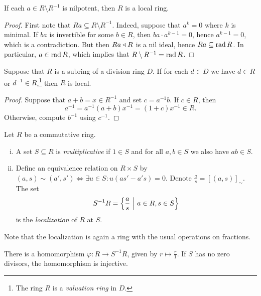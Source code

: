 \begin{trditev}
If each $a \in R \setminus R^{-1}$ is nilpotent, then $R$ is a
local ring.
\end{trditev}

\begin{proof}
First note that $Ra \subseteq R \setminus R^{-1}$. Indeed, suppose
that $a^k = 0$ where $k$ is minimal. If $ba$ is invertible for some
$b \in R$, then $ba \cdot a^{k-1} = 0$, hence $a^{k-1} = 0$, which
is a contradiction. But then $Ra \triangleleft R$ is a nil ideal, hence
$Ra \subseteq \operatorname{rad} R$. In particular, $a \in \operatorname{rad} R$, which implies
that $R \setminus R^{-1} = \operatorname{rad} R$.
\end{proof}

\begin{trditev}
Suppose that $R$ is a subring of a division ring $D$. If for each
$d \in D$ we have $d \in R$ or $d^{-1} \in R$,\footnote{The ring
$R$ is a \emph{valuation ring} in $D$.} then
$R$ is local.
\end{trditev}

\begin{proof}
Suppose that $a+b = x \in R^{-1}$ and set $c = a^{-1} b$. If
$c \in R$, then
\[
a^{-1} = a^{-1} (a+b) x^{-1} = (1 + c) x^{-1} \in R.
\]
Otherwise, compute $b^{-1}$ using $c^{-1}$.
\end{proof}


\begin{definicija}
Let $R$ be a commutative ring.

\begin{enumerate}[i)]
\item A set $S \subseteq R$ is
\emph{multiplicative} if $1 \in S$ and
for all $a, b \in S$ we also have $ab \in S$.
\item Define an equivalence relation on $R \times S$ by
$(a, s) \sim (a', s') \iff
\exists u \in S \colon u (as' - a's) = 0$. Denote
$\frac{a}{s} = [(a,s)]_\sim$. The set
\[
S^{-1} R = \left\{\frac{a}{s}~\middle\vert~a \in R, s \in S\right\}
\]
is the \emph{localization} of $R$ at $S$.
\end{enumerate}
\end{definicija}

\begin{opomba}
Note that the localization is again a ring with the usual
operations on fractions.
\end{opomba}

\begin{opomba}
There is a homomorphism $\varphi \colon R \to S^{-1} R$, given by
$r \mapsto \frac{r}{1}$. If $S$ has no zero divisors, the
homomorphism is injective.
\end{opomba}

